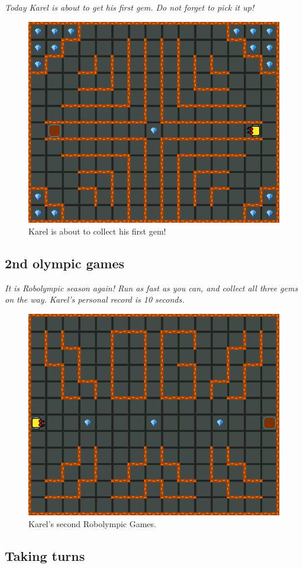 {\em Today Karel is about to get his first gem. Do not forget to pick it up!}

\begin{figure}[!ht]
\begin{center}
\includegraphics[height=0.4\textwidth]{img/a03.png}
\end{center}
\vspace{-4mm}
\caption{Karel is about to collect his first gem!}
\label{fig:a03}
\vspace{-1cm}
\end{figure}
\noindent

\subsection{2nd olympic games}

{\em It is Robolympic season again! Run as fast as you can, and collect all three gems on the way. Karel's personal record is 10 seconds.}


\begin{figure}[!ht]
\begin{center}
\includegraphics[height=0.4\textwidth]{img/a04.png}
\end{center}
\vspace{-4mm}
\caption{Karel's second Robolympic Games.}
\label{fig:a04}
\vspace{-1cm}
\end{figure}
\noindent


\subsection{Taking turns}

